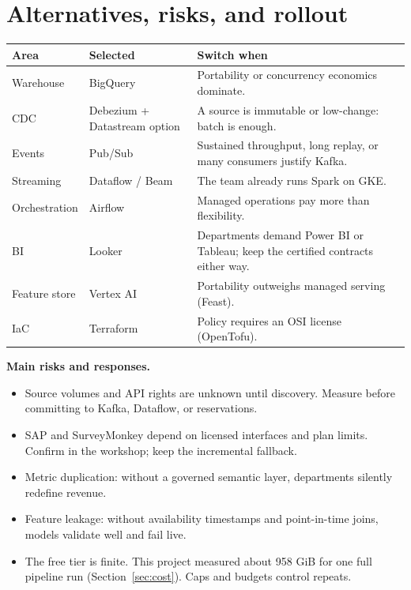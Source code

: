 \documentclass[10pt,a4paper]{article}
\begin{document}
\section{Alternatives, risks, and rollout}

{\small
\begin{tabularx}{\textwidth}{L{26mm}L{44mm}Y}
\toprule
\textbf{Area} & \textbf{Selected} & \textbf{Switch when} \\
\midrule
Warehouse & BigQuery & Portability or concurrency economics dominate. \\
CDC & Debezium + Datastream option & A source is immutable or low-change: batch is enough. \\
Events & Pub/Sub & Sustained throughput, long replay, or many consumers justify Kafka. \\
Streaming & Dataflow / Beam & The team already runs Spark on GKE. \\
Orchestration & Airflow & Managed operations pay more than flexibility. \\
BI & Looker & Departments demand Power BI or Tableau; keep the certified contracts either way. \\
Feature store & Vertex AI & Portability outweighs managed serving (Feast). \\
IaC & Terraform & Policy requires an OSI license (OpenTofu). \\
\bottomrule
\end{tabularx}
}

\textbf{Main risks and responses.}
\begin{itemize}
  \item Source volumes and API rights are unknown until discovery. Measure before committing to Kafka, Dataflow, or reservations.
  \item SAP and SurveyMonkey depend on licensed interfaces and plan limits. Confirm in the workshop; keep the incremental fallback.
  \item Metric duplication: without a governed semantic layer, departments silently redefine revenue.
  \item Feature leakage: without availability timestamps and point-in-time joins, models validate well and fail live.
  \item The free tier is finite. This project measured about 958 GiB for one full pipeline run (Section~\ref{sec:cost}). Caps and budgets control repeats.
\end{itemize}
\end{document}
